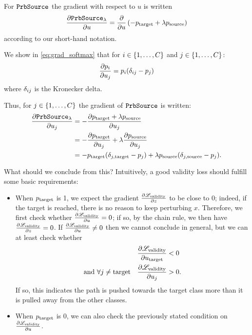 \documentclass[../main.tex]{subfiles}
\begin{document}
For $\mathtt{PrbSource}_{}$ the gradient with respect to $u$ is written
\begin{align*}
    \frac{\partial \mathtt{PrbSource}_{\lambda}}{\partial u}
    = \frac{\partial }{\partial u} \left( - p_{\mathrm{target}} + \lambda p_{\mathrm{source}} \right)
\end{align*}
according to our short-hand notation.


We show in \autoref{eq:grad_softmax} that for $i \in \left\{1, \ldots, C\right\}$ and 
$j \in \left\{1, \ldots, C\right\}$:
\begin{align*}
    \frac{\partial p_i}{\partial u_j} = p_i ( \delta_{ij}  -  p_j )
\end{align*}
where $\delta_{ij}$ is the Kronecker delta.

Thus, for $j \in \left\{1, \ldots, C\right\}$ the gradient of $\mathtt{PrbSource}_{}$ is written:
\begin{align*}
    \frac{\partial \mathtt{PrbSource}_{\lambda}}{\partial u_j}
=  - & \frac{\partial p_{\mathrm{target}}  + \lambda p_{\mathrm{source}}}{\partial u_j}  \\
=  - & \frac{\partial p_{\mathrm{target}} }{\partial u_j} + \lambda \frac{\partial p_{\mathrm{source}}}{\partial u_j}  \\
=  - & p_{\mathrm{target}} (\delta_{j, \mathrm{target}} - p_j) + \lambda p_{\mathrm{source}} (\delta_{j, \mathrm{source}} - p_j).
\end{align*}

What should we conclude from this?
Intuitively, a good validity loss should fulfill some basic requirements:
\begin{itemize}
    \item When $p_{\mathrm{target}}$ is 1, we expect the gradient $\frac{\partial \mathscr{L}_\text{validity}}{\partial z}$ to be close to 0; indeed, if the target is reached, there is no reason to keep perturbing $x$.
    Therefore, we first check whether $\frac{\partial \mathscr{L}_\text{validity}}{\partial u} = 0$; if so, by the chain rule, we then have $\frac{\partial \mathscr{L}_\text{validity}}{\partial z} = 0$.
    If $\frac{\partial \mathscr{L}_\text{validity}}{\partial u} \neq 0$ then we cannot conclude in general, but we can at least check whether 
    \begin{align*}
                                 \frac{\partial \mathscr{L}_\text{validity}}{\partial u_{\mathrm{target}}} &< 0 \\ 
    \text{and } \forall j \neq \mathrm{target} \quad \frac{\partial \mathscr{L}_\text{validity}}{\partial u_j} &> 0.
    \end{align*}
    If so, this indicates the path is pushed towards the target class
    more than it is pulled away from the other classes.

    \item When $p_{\mathrm{target}}$ is 0, we can also check the previously stated condition on $\frac{\partial \mathscr{L}_\text{validity}}{\partial u}$.
\end{itemize}
\end{document}
